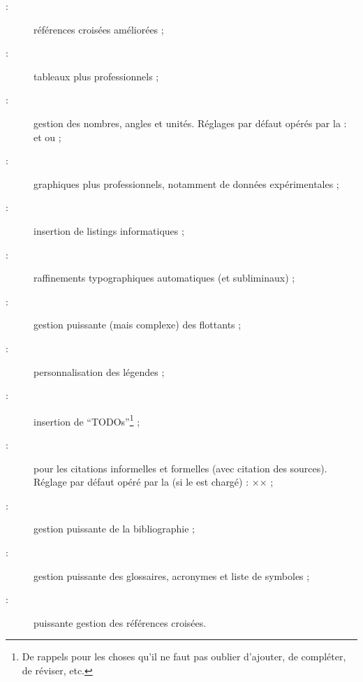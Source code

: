 \begin{description}
\item[ :] références croisées améliorées ;
\item[ :] tableaux plus professionnels ;
\item[ :] gestion des nombres, angles et unités. Réglages par
  défaut opérés par la \yatcl :  et  ou
  \selonlangue{} ;
\item[ :] graphiques plus professionnels,
  notamment de données expérimentales ;
\item[ :] insertion de listings informatiques ;
\item[ :] raffinements typographiques
  automatiques (et subliminaux) ;
\item[ :] gestion puissante (mais complexe) des
  flottants ;
\item[ :] personnalisation des légendes ;
\item[ :] insertion de
  \foreignquote{english}{TODOs}\footnote{De rappels pour les choses qu'il ne
    faut pas oublier d'ajouter, de compléter, de réviser, etc.} ;
\item[ :] pour les citations informelles et formelles (avec
  citation des sources). Réglage par défaut opéré par la \yatcl (si le
   est chargé) : ×\SetCiteCommand{\autocite}× ;
\item[ :] gestion puissante de la bibliographie ;
\item[ :] gestion puissante des glossaires,
  acronymes et liste de symboles ;
\item[ :] puissante gestion des références croisées.
\end{description}

%
\iffalse
\fi
